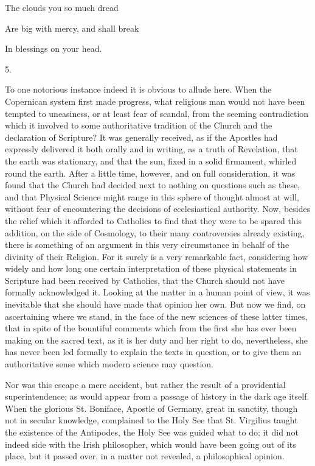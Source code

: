 The clouds you so much dread

Are big with mercy, and shall break

In blessings on your head.

5.

To one notorious instance indeed it is obvious to allude here. When
the Copernican system first made progress, what religious man would
not have been tempted to uneasiness, or at least fear of scandal, from
the seeming contradiction which it involved to some authoritative
tradition of the Church and the declaration of Scripture? It was
generally received, as if the Apostles had expressly delivered it both
orally and in writing, as a truth of Revelation, that the earth was
stationary, and that the sun, fixed in a solid firmament,
whirled round the earth. After a little time, however, and on full
consideration, it was found that the Church had decided next to
nothing on questions such as these, and that Physical Science might
range in this sphere of thought almost at will, without fear of
encountering the decisions of ecclesiastical authority. Now, besides
the relief which it afforded to Catholics to find that they were to be
spared this addition, on the side of Cosmology, to their many
controversies already existing, there is something of an argument in
this very circumstance in behalf of the divinity of their Religion.
For it surely is a very remarkable fact, considering how widely and
how long one certain interpretation of these physical statements in
Scripture had been received by Catholics, that the Church should not
have formally acknowledged it. Looking at the matter in a human point
of view, it was inevitable that she should have made that opinion her
own. But now we find, on ascertaining where we stand, in the face of
the new sciences of these latter times, that in spite of the bountiful
comments which from the first she has ever been making on the sacred
text, as it is her duty and her right to do, nevertheless, she has
never been led formally to explain the texts in question, or to give
them an authoritative sense which modern science may question.

Nor was this escape a mere accident, but rather the result of a
providential superintendence; as would appear from a passage of
history in the dark age itself. When the glorious St. Boniface,
Apostle of Germany, great in sanctity, though not in secular
knowledge, complained to the Holy See that St. Virgilius taught the
existence of the Antipodes, the Holy See was guided what to do; it did
not indeed side with the Irish philosopher, which would have
been going out of its place, but it passed over, in a matter not
revealed, a philosophical opinion.

